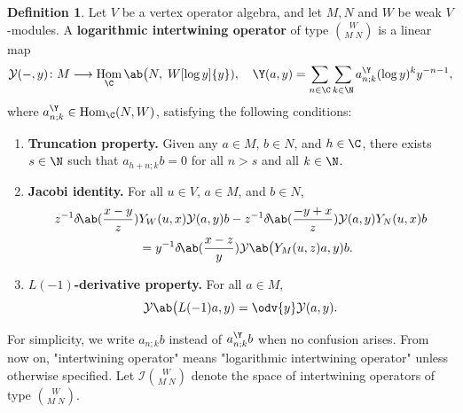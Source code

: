 \documentclass[12pt, english]{article}
\numberwithin{equation}{section}
\DeclareMathOperator{\Hom}{Hom}
\theoremstyle{plain}
\theoremstyle{definition}
\newtheorem{definition}[lemma]{Definition}
\theoremstyle{remark}
\begin{document}
	\begin{definition}\label{def:logarithmic-intertwiner}
		Let $V$ be a vertex operator algebra, and let $M, N$ and $W$ be weak $V$-modules. A \textbf{logarithmic intertwining operator} of type $\binom{W}{M \; N}$ is a linear map
		\[
		\mathcal{Y}(-, y) \colon M \longrightarrow \Hom_{\C} \ab\big(N, \; W[\log y] \{y\}), \quad
		\Y(a, y) = \sum_{n \in \C} \sum_{ k \in \N} a^{\Y}_{n; k} (\log y)^k y^{-n-1},
		\]
		where $a^{\Y}_{n; k} \in \Hom_{\C}(N, W)$,  satisfying the following conditions:
		
		\begin{enumerate}[label=(\arabic*),ref=\arabic*]
			
			\item \textbf{Truncation property.} Given any $a \in M$, $b \in N$, and $h \in \C$, there exists $s \in \N$ such that $a_{h+n;k}b = 0$ for all $n > s$ and all $k \in \N$.
			
			\item \textbf{Jacobi identity.} For all $u \in V$, $a \in M$, and $b \in N$,
			\begin{align*} \label{eq:intertwiner-jacobi}
				z^{-1} \delta\! \ab(\frac{x-y}{z}) & Y_{W}(u, x) \mathcal{Y}(a, y) b
				- z^{-1} \delta\! \ab(\frac{-y+x}{z}) \mathcal{Y}(a, y) Y_{N}(u, x) b \notag \\
				& = y^{-1} \delta\! \ab(\frac{x-z}{y}) \mathcal{Y} \ab\big(Y_{M}(u, z) a, y) b.
			\end{align*}
			
			\item \textbf{$L(-1)$-derivative property.} For all $a \in M$,
			\begin{equation*} \label{eq:intertwiner-derivative}
				\mathcal{Y} \ab\big(L(-1) a, y) = \odv{y}\mathcal{Y}(a, y).
			\end{equation*}
			
		\end{enumerate}
		
	\end{definition}
	
	For simplicity, we write $a_{n;k}b$ instead of $a^\Y_{n;k}b$ when no confusion arises.
	From now on, "intertwining operator" means "logarithmic intertwining operator" unless otherwise specified.
	Let $\mathcal{I}\binom{W}{M\;N}$ denote the space of intertwining operators of type $\binom{W}{M\;N}$.
	
\end{document}
